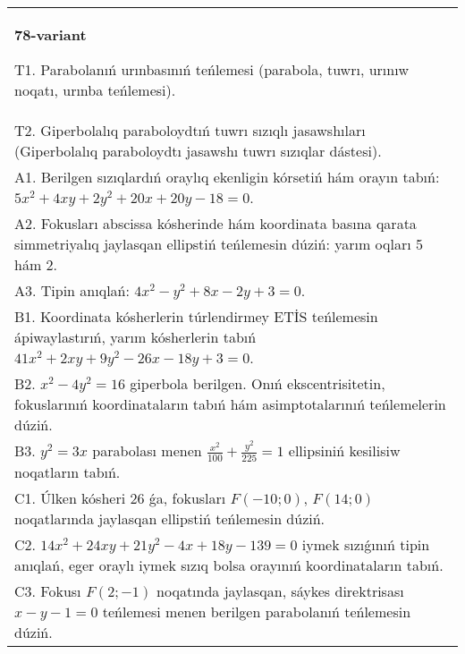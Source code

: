 \documentclass{article}
\begin{document}
\begin{tabular}{m{17cm}}
\textbf{78-variant}
\newline

T1. Parabolanıń urınbasınıń teńlemesi (parabola, tuwrı, urınıw noqatı, urınba teńlemesi).\\

T2. Giperbolalıq paraboloydtıń tuwrı sızıqlı jasawshıları (Giperbolalıq paraboloydtı jasawshı tuwrı sızıqlar dástesi).\\

A1. Berilgen sızıqlardıń oraylıq ekenligin kórsetiń hám orayın tabıń: $5 x^{2}+4 xy+2 y^{2}+20 x+20 y-18=0$.\\

A2. Fokusları abscissa kósherinde hám koordinata basına qarata simmetriyalıq jaylasqan ellipstiń teńlemesin dúziń: yarım oqları 5 hám 2.\\

A3. Tipin anıqlań: $4 x^{2}-y^{2}+8 x-2 y+3=0$.\\

B1. Koordinata kósherlerin túrlendirmey ETİS teńlemesin ápiwaylastırıń, yarım kósherlerin tabıń $41x^{2} + 2xy + 9y^{2} - 26x - 18y + 3 = 0$.  \\

B2. $x^{2} - 4y^{2} = 16$ giperbola berilgen. Onıń ekscentrisitetin, fokuslarınıń koordinataların tabıń hám asimptotalarınıń teńlemelerin dúziń.\\

B3. $y^{2} = 3x$ parabolası menen $\frac{x^{2}}{100} + \frac{y^{2}}{225} = 1$ ellipsiniń kesilisiw noqatların tabıń.  \\

C1. Úlken kósheri 26 ǵa, fokusları $F( - 10;0)$, $F(14;0)$ noqatlarında jaylasqan ellipstiń teńlemesin dúziń.  \\

C2. $14x^{2} + 24xy + 21y^{2} - 4x + 18y - 139 = 0$ iymek sızıǵınıń tipin anıqlań, eger oraylı iymek sızıq bolsa orayınıń koordinataların tabıń.  \\

C3. Fokusı $F(2; - 1)$ noqatında jaylasqan, sáykes direktrisası $x - y - 1 = 0$ teńlemesi menen berilgen parabolanıń teńlemesin dúziń.  \\

\end{tabular}
\vspace{1cm}
\end{document}
